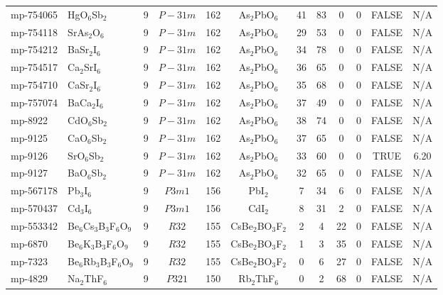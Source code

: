 {\begin{longtable}{llcccccccccc}
    mp-754065 & HgO$_{6}$Sb$_{2}$ & 9     & $P-31m$ & 162   & As$_{2}$PbO$_{6}$ & 41    & 83    & 0     & 0     & FALSE & N/A \\
    mp-754118 & SrAs$_{2}$O$_{6}$ & 9     & $P-31m$ & 162   & As$_{2}$PbO$_{6}$ & 29    & 53    & 0     & 0     & FALSE & N/A \\
    mp-754212 & BaSr$_{2}$I$_{6}$ & 9     & $P-31m$ & 162   & As$_{2}$PbO$_{6}$ & 34    & 78    & 0     & 0     & FALSE & N/A \\
    mp-754517 & Ca$_{2}$SrI$_{6}$ & 9     & $P-31m$ & 162   & As$_{2}$PbO$_{6}$ & 36    & 65    & 0     & 0     & FALSE & N/A \\
    mp-754710 & CaSr$_{2}$I$_{6}$ & 9     & $P-31m$ & 162   & As$_{2}$PbO$_{6}$ & 35    & 68    & 0     & 0     & FALSE & N/A \\
    mp-757074 & BaCa$_{2}$I$_{6}$ & 9     & $P-31m$ & 162   & As$_{2}$PbO$_{6}$ & 37    & 49    & 0     & 0     & FALSE & N/A \\
    mp-8922 & CdO$_{6}$Sb$_{2}$ & 9     & $P-31m$ & 162   & As$_{2}$PbO$_{6}$ & 38    & 74    & 0     & 0     & FALSE & N/A \\
    mp-9125 & CaO$_{6}$Sb$_{2}$ & 9     & $P-31m$ & 162   & As$_{2}$PbO$_{6}$ & 37    & 65    & 0     & 0     & FALSE & N/A \\
    mp-9126 & SrO$_{6}$Sb$_{2}$ & 9     & $P-31m$ & 162   & As$_{2}$PbO$_{6}$ & 33    & 60    & 0     & 0     & TRUE  & 6.20  \\
    mp-9127 & BaO$_{6}$Sb$_{2}$ & 9     & $P-31m$ & 162   & As$_{2}$PbO$_{6}$ & 32    & 65    & 0     & 0     & FALSE & N/A \\
    mp-567178 & Pb$_{3}$I$_{6}$ & 9     & $P3m1$ & 156   & PbI$_{2}$ & 7     & 34    & 6     & 0     & FALSE & N/A \\
    mp-570437 & Cd$_{3}$I$_{6}$ & 9     & $P3m1$ & 156   & CdI$_{2}$ & 8     & 31    & 2     & 0     & FALSE & N/A \\
    mp-553342 & Be$_{6}$Cs$_{3}$B$_{3}$F$_{6}$O$_{9}$ & 9     & $R32$ & 155   & CsBe$_{2}$BO$_{3}$F$_{2}$ & 2     & 4     & 22    & 0     & FALSE & N/A \\
    mp-6870 & Be$_{6}$K$_{3}$B$_{3}$F$_{6}$O$_{9}$ & 9     & $R32$ & 155   & CsBe$_{2}$BO$_{3}$F$_{2}$ & 1     & 3     & 35    & 0     & FALSE & N/A \\
    mp-7323 & Be$_{6}$Rb$_{3}$B$_{3}$F$_{6}$O$_{9}$ & 9     & $R32$ & 155   & CsBe$_{2}$BO$_{3}$F$_{2}$ & 0     & 6     & 27    & 0     & FALSE & N/A \\
    mp-4829 & Na$_{2}$ThF$_{6}$ & 9     & $P321$ & 150   & Rb$_{2}$ThF$_{6}$ & 0     & 2     & 68    & 0     & FALSE & N/A \\

\end{longtable}}
